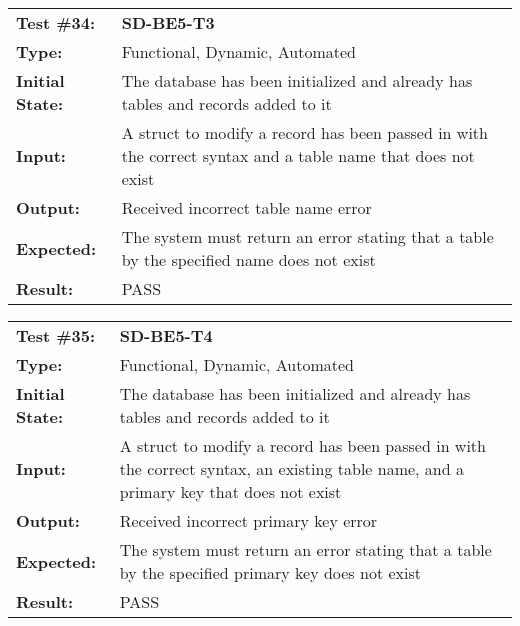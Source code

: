 \documentclass[12pt, titlepage]{article}
\begin{document}
\begin{mdframed}[linewidth=1pt]
\begin{tabularx}{\textwidth}{@{}p{3cm}X@{}}
{\bf Test \#34:} & {\bf SD-BE5-T3}\\[\baselineskip]
{\bf Type:} & Functional, Dynamic, Automated \\[0.5\baselineskip]
{\bf Initial State:} & The database has been initialized and already has tables and records added to it \\[\baselineskip]
{\bf Input:} & A struct to modify a record has been passed in with the correct syntax and a table name that does not exist \\[\baselineskip]
{\bf Output:} & Received incorrect table name error \\[\baselineskip]
{\bf Expected:} & The system must return an error stating that a table by the specified name does not exist \\[\baselineskip]
{\bf Result:} & PASS
\end{tabularx}
\end{mdframed} 

\begin{mdframed}[linewidth=1pt]
\begin{tabularx}{\textwidth}{@{}p{3cm}X@{}}
{\bf Test \#35:} & {\bf SD-BE5-T4}\\[\baselineskip]
{\bf Type:} & Functional, Dynamic, Automated \\[0.5\baselineskip]
{\bf Initial State:} & The database has been initialized and already has tables and records added to it \\[\baselineskip]
{\bf Input:} & A struct to modify a record has been passed in with the correct syntax, an existing table name, and a primary key that does not exist \\[\baselineskip]
{\bf Output:} & Received incorrect primary key error \\[\baselineskip]
{\bf Expected:} & The system must return an error stating that a table by the specified primary key does not exist \\[\baselineskip]
{\bf Result:} & PASS
\end{tabularx}
\end{mdframed} 
\end{document}
